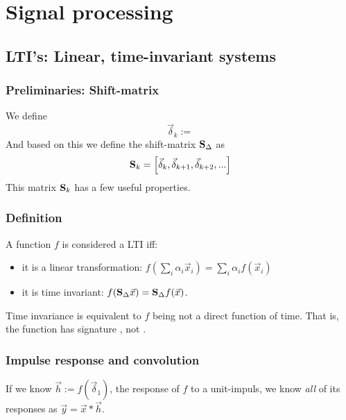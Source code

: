 \section{Signal processing}

\subsection{LTI's: Linear, time-invariant systems}

\subsubsection{Preliminaries: Shift-matrix}

We define 
$$ \vec{\delta}_k :=  $$
And based on this we define the shift-matrix $\mathbf{S}_\Delta$ as
$$ \mathbf{S}_k = \left[ \vec{\delta}_{k}, \vec{\delta}_{k+1}, \vec{\delta}_{k+2}, ... \right] $$
This matrix $\mathbf{S}_k$ has a few useful properties.

\subsubsection{Definition}

A function $f$ is considered a LTI iff: 

\begin{itemize}
    \item it is a linear transformation: $f(\sum_i \alpha_i \vec{x}_i) = \sum_i \alpha_i f(\vec{x}_i)$
    \item it is time invariant: $ f(\mathbf{S}_\Delta \vec{x}) = \mathbf{S}_\Delta f(\vec{x})$.
\end{itemize}

Time invariance is equivalent to $f$ being not a direct function of time. That is, the function has signature , not .

\subsubsection{Impulse response and convolution}

If we know $\vec{h} := f(\vec{\delta}_1)$, the response of $f$ to a unit-impuls, we know \emph{all} of its responses as $\vec{y} = \vec{x} * \vec{h}$.

